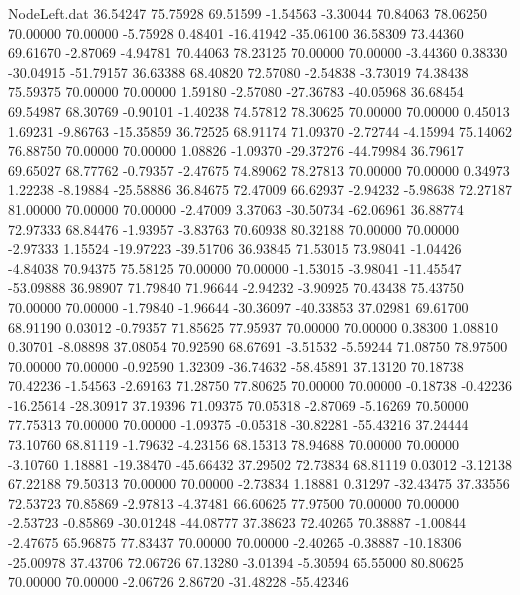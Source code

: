 \begin{filecontents}{NodeLeft.dat}
  36.54247   75.75928   69.51599    -1.54563   -3.30044   70.84063   78.06250   70.00000   70.00000   -5.75928    0.48401  -16.41942  -35.06100
  36.58309   73.44360   69.61670    -2.87069   -4.94781   70.44063   78.23125   70.00000   70.00000   -3.44360    0.38330  -30.04915  -51.79157
  36.63388   68.40820   72.57080    -2.54838   -3.73019   74.38438   75.59375   70.00000   70.00000    1.59180   -2.57080  -27.36783  -40.05968
  36.68454   69.54987   68.30769    -0.90101   -1.40238   74.57812   78.30625   70.00000   70.00000    0.45013    1.69231   -9.86763  -15.35859
  36.72525   68.91174   71.09370    -2.72744   -4.15994   75.14062   76.88750   70.00000   70.00000    1.08826   -1.09370  -29.37276  -44.79984
  36.79617   69.65027   68.77762    -0.79357   -2.47675   74.89062   78.27813   70.00000   70.00000    0.34973    1.22238   -8.19884  -25.58886
  36.84675   72.47009   66.62937    -2.94232   -5.98638   72.27187   81.00000   70.00000   70.00000   -2.47009    3.37063  -30.50734  -62.06961
  36.88774   72.97333   68.84476    -1.93957   -3.83763   70.60938   80.32188   70.00000   70.00000   -2.97333    1.15524  -19.97223  -39.51706
  36.93845   71.53015   73.98041    -1.04426   -4.84038   70.94375   75.58125   70.00000   70.00000   -1.53015   -3.98041  -11.45547  -53.09888
  36.98907   71.79840   71.96644    -2.94232   -3.90925   70.43438   75.43750   70.00000   70.00000   -1.79840   -1.96644  -30.36097  -40.33853
  37.02981   69.61700   68.91190     0.03012   -0.79357   71.85625   77.95937   70.00000   70.00000    0.38300    1.08810    0.30701   -8.08898
  37.08054   70.92590   68.67691    -3.51532   -5.59244   71.08750   78.97500   70.00000   70.00000   -0.92590    1.32309  -36.74632  -58.45891
  37.13120   70.18738   70.42236    -1.54563   -2.69163   71.28750   77.80625   70.00000   70.00000   -0.18738   -0.42236  -16.25614  -28.30917
  37.19396   71.09375   70.05318    -2.87069   -5.16269   70.50000   77.75313   70.00000   70.00000   -1.09375   -0.05318  -30.82281  -55.43216
  37.24444   73.10760   68.81119    -1.79632   -4.23156   68.15313   78.94688   70.00000   70.00000   -3.10760    1.18881  -19.38470  -45.66432
  37.29502   72.73834   68.81119     0.03012   -3.12138   67.22188   79.50313   70.00000   70.00000   -2.73834    1.18881    0.31297  -32.43475
  37.33556   72.53723   70.85869    -2.97813   -4.37481   66.60625   77.97500   70.00000   70.00000   -2.53723   -0.85869  -30.01248  -44.08777
  37.38623   72.40265   70.38887    -1.00844   -2.47675   65.96875   77.83437   70.00000   70.00000   -2.40265   -0.38887  -10.18306  -25.00978
  37.43706   72.06726   67.13280    -3.01394   -5.30594   65.55000   80.80625   70.00000   70.00000   -2.06726    2.86720  -31.48228  -55.42346

\end{filecontents}
